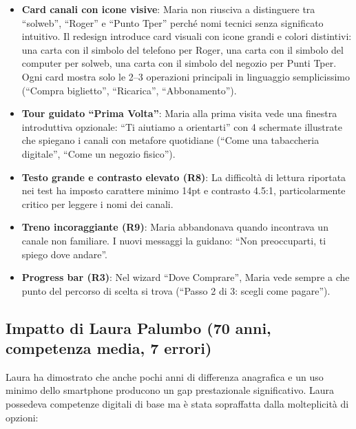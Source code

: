 \documentclass[11pt,a4paper]{article}
\begin{document}
\begin{itemize}
    \item \textbf{Card canali con icone visive}: Maria non riusciva a distinguere tra ``solweb'', ``Roger'' e ``Punto Tper'' perch\'e nomi tecnici senza significato intuitivo. Il redesign introduce card visuali con icone grandi e colori distintivi: una carta con il simbolo del telefono per Roger, una carta con il simbolo del computer per solweb, una carta con il simbolo del negozio per Punti Tper. Ogni card mostra solo le 2--3 operazioni principali in linguaggio semplicissimo (``Compra biglietto'', ``Ricarica'', ``Abbonamento'').
    \item \textbf{Tour guidato ``Prima Volta''}: Maria alla prima visita vede una finestra introduttiva opzionale: ``Ti aiutiamo a orientarti'' con 4 schermate illustrate che spiegano i canali con metafore quotidiane (``Come una tabaccheria digitale'', ``Come un negozio fisico'').
    \item \textbf{Testo grande e contrasto elevato (R8)}: La difficolt\`a di lettura riportata nei test ha imposto carattere minimo 14pt e contrasto 4.5:1, particolarmente critico per leggere i nomi dei canali.
    \item \textbf{Treno incoraggiante (R9)}: Maria abbandonava quando incontrava un canale non familiare. I nuovi messaggi la guidano: ``Non preoccuparti, ti spiego dove andare''.
    \item \textbf{Progress bar (R3)}: Nel wizard ``Dove Comprare'', Maria vede sempre a che punto del percorso di scelta si trova (``Passo 2 di 3: scegli come pagare'').
\end{itemize}

\subsection{Impatto di Laura Palumbo (70 anni, competenza media, 7 errori)}

Laura ha dimostrato che anche pochi anni di differenza anagrafica e un uso minimo dello smartphone producono un gap prestazionale significativo. Laura possedeva competenze digitali di base ma \`e stata sopraffatta dalla molteplicit\`a di opzioni:
\end{document}
